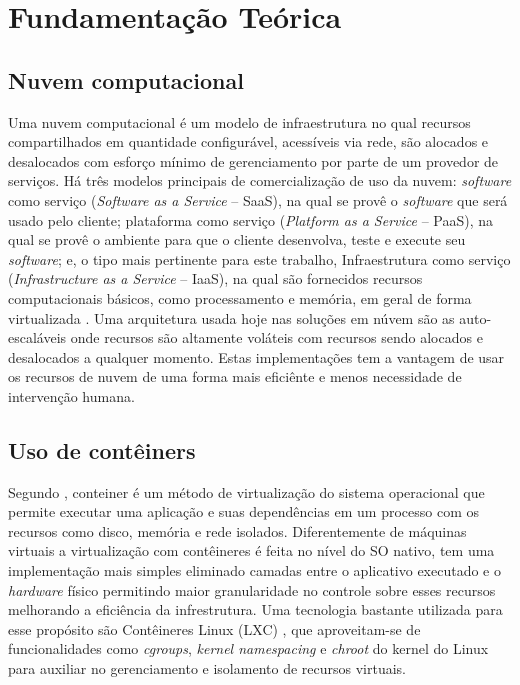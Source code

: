 \chapter{Fundamentação Teórica}

\section{Nuvem computacional}
\label{sec:computacaonuvem}

Uma nuvem computacional é um modelo de infraestrutura no qual recursos compartilhados em quantidade configurável, acessíveis via rede, são alocados e desalocados com esforço mínimo de gerenciamento por parte de um provedor de serviços.
%
Há três modelos principais de comercialização de uso da nuvem: \textit{software} como serviço (\textit{Software as a Service} -- SaaS), na qual se provê o \textit{software} que será usado pelo cliente; plataforma como serviço (\textit{Platform as a Service} -- PaaS), na qual se provê o ambiente para que o cliente desenvolva, teste e execute seu \textit{software}; e, o tipo mais pertinente para este trabalho, Infraestrutura como serviço (\textit{Infrastructure as a Service} -- IaaS), na qual são fornecidos recursos computacionais básicos, como processamento e memória, em geral de forma virtualizada \cite{NIST2011}.
%
Uma arquitetura usada hoje nas soluções em núvem são as auto-escaláveis onde recursos são altamente voláteis com recursos sendo alocados e desalocados a qualquer momento. Estas implementações tem a vantagem de usar os recursos de nuvem de uma forma mais eficiênte e menos necessidade de intervenção humana.


\section{Uso de contêiners}
\label{sec:conteiner}

Segundo \cite{AmazonContainer}, conteiner é um método de virtualização do sistema operacional que permite executar uma aplicação e suas dependências em um processo com os recursos como disco, memória e rede isolados.
%
Diferentemente de máquinas virtuais a virtualização com contêineres é feita no nível do SO nativo, tem uma implementação mais simples eliminado camadas entre o aplicativo executado e o \textit{hardware} físico permitindo maior granularidade no controle sobre esses recursos melhorando a eficiência da infrestrutura.
%
Uma tecnologia bastante utilizada para esse propósito são Contêineres Linux (LXC) \cite{Linuxcontainers.org2015}, que aproveitam-se de funcionalidades como \textit{cgroups}, \textit{kernel namespacing} e \textit{chroot} do kernel do Linux para auxiliar no gerenciamento e isolamento de recursos virtuais.

